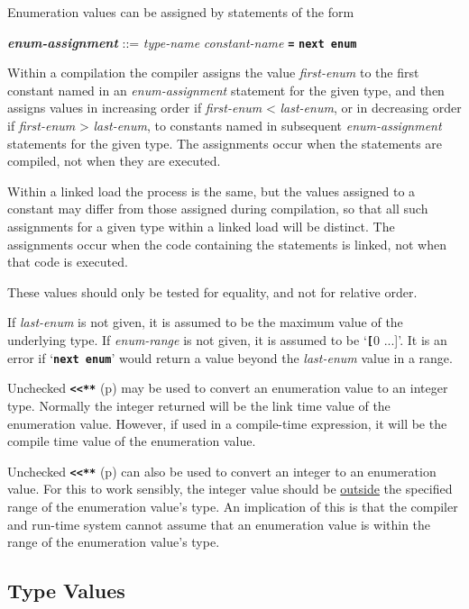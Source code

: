 \documentclass[12pt]{article}
\makeatletter
\newcommand{\TT}[1]{{\tt \bfseries #1}}
\newcommand{\emkey}[1]{{\bf \em #1}\index{#1@{\em #1}}}
\newcommand{\pagref}[1]{p\pageref{#1}}
\newenvironment{indpar}[1][0.3in]%
	{\begin{list}{}%
		     {\setlength{\itemsep}{0in}%
		      \setlength{\topsep}{0in}%
		      \setlength{\parsep}{1ex}%
		      \setlength{\labelwidth}{#1}%
		      \setlength{\leftmargin}{#1}%
		      \addtolength{\leftmargin}{\labelsep}}%
	 \item}%
	{\end{list}}
\makeatother
\begin{document}
Enumeration values can be assigned by statements of the form
\begin{indpar}
\emkey{enum-assignment}
    ::= {\em type-name} {\em constant-name} \TT{=} \TT{next enum}
\end{indpar}

Within a compilation the compiler assigns the value {\em first-enum}
to the first constant named in an {\em enum-assignment} statement for
the given type, and then
assigns values in increasing order if {\em first-enum} < {\em last-enum},
or in decreasing order if {\em first-enum} > {\em last-enum}, to
constants named in subsequent {\em enum-assignment} statements for
the given type.  The assignments occur when the statements are
compiled, not when they are executed.

Within a linked load the process is the same, but the values assigned
to a constant may differ from those assigned during compilation,
so that all such assignments for a given type within a linked load
will be distinct.  The assignments occur when the code containing
the statements is linked, not when that code is executed.

These values should only be tested for equality, and not for
relative order.

If {\em last-enum} is not given, it is assumed to be the maximum
value of the underlying type.  If {\em enum-range} is not given,
it is assumed to be `\TT[0 ...]'.  It is an error if `\TT{next enum}'
would return a value beyond the {\em last-enum} value in a range.

Unchecked \TT{<<**} (\pagref{<<**}) may be used to convert
an enumeration value to an integer type.  Normally the integer
returned will be the link time value of the enumeration value.
However, if used in a compile-time expression, it will be the
compile time value of the enumeration value.

Unchecked \TT{<<**} (\pagref{<<**}) can also be used to convert
an integer to an enumeration value.  For this to work sensibly,
the integer value should be \underline{outside} the specified
range of the enumeration value's type.  An implication of this
is that the compiler and run-time system cannot assume that
an enumeration value is within the range of the
enumeration value's type.

\subsection{Type Values}
\label{TYPE-VALUES}
\end{document}
